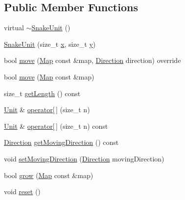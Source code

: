\subsection*{Public Member Functions}
\begin{DoxyCompactItemize}
\item 
virtual \hyperlink{classarcade_1_1_snake_unit_a797151ca359cb8b6798c24feed6fba45}{$\sim$\+Snake\+Unit} ()
\item 
\hyperlink{classarcade_1_1_snake_unit_a66cb5100f926b000b3931c5fb6dfbfad}{Snake\+Unit} (size\+\_\+t \hyperlink{include_2_protocol_8hpp_a4dde988b1b2adba65ae3efa69f65d960}{x}, size\+\_\+t \hyperlink{include_2_protocol_8hpp_ab0580f504a7428539be299fa71565f30}{y})
\item 
bool \hyperlink{classarcade_1_1_snake_unit_ac291cd07b71f42589e29157fdcf52416}{move} (\hyperlink{classarcade_1_1_map}{Map} const \&map, \hyperlink{classarcade_1_1_unit_af418afeaba1f7fd5934b6ae1343215dd}{Direction} direction) override
\item 
bool \hyperlink{classarcade_1_1_snake_unit_a2a0c1cf1880b9c595706dc0b4202e46a}{move} (\hyperlink{classarcade_1_1_map}{Map} const \&map)
\item 
size\+\_\+t \hyperlink{classarcade_1_1_snake_unit_a7449a250cc1e8c2027e660af40b5454a}{get\+Length} () const
\item 
\hyperlink{classarcade_1_1_unit}{Unit} \& \hyperlink{classarcade_1_1_snake_unit_a29fba4415dc5202deb2b543ea9bcafec}{operator\mbox{[}$\,$\mbox{]}} (size\+\_\+t n)
\item 
\hyperlink{classarcade_1_1_unit}{Unit} \& \hyperlink{classarcade_1_1_snake_unit_a364db276d19b00961a8e445bca7a2d55}{operator\mbox{[}$\,$\mbox{]}} (size\+\_\+t n) const
\item 
\hyperlink{classarcade_1_1_unit_af418afeaba1f7fd5934b6ae1343215dd}{Direction} \hyperlink{classarcade_1_1_snake_unit_a26e52c313c70b4dbc62f0a00f1d29b01}{get\+Moving\+Direction} () const
\item 
void \hyperlink{classarcade_1_1_snake_unit_abc2d43a7920a1bdba452aa888a7e00d1}{set\+Moving\+Direction} (\hyperlink{classarcade_1_1_unit_af418afeaba1f7fd5934b6ae1343215dd}{Direction} moving\+Direction)
\item 
bool \hyperlink{classarcade_1_1_snake_unit_a66b1ed720c9934352f2b23c29ad12b35}{grow} (\hyperlink{classarcade_1_1_map}{Map} const \&map)
\item 
void \hyperlink{classarcade_1_1_snake_unit_aad0f18af64879c5ec44d9f14517abee6}{reset} ()
\end{DoxyCompactItemize}

